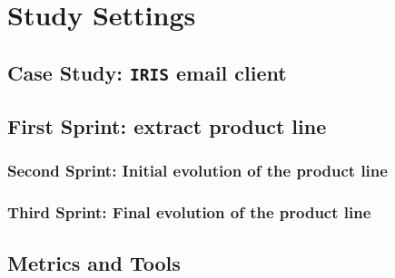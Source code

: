 \section{Study Settings}


% 

\subsection{Case Study: \texttt{IRIS} email client}

%
%

\subsection{First Sprint: extract product line}

\subsubsection{Second Sprint: Initial evolution of the product line}


\subsubsection{Third Sprint: Final evolution of the product line}




\subsection{Metrics and Tools}


